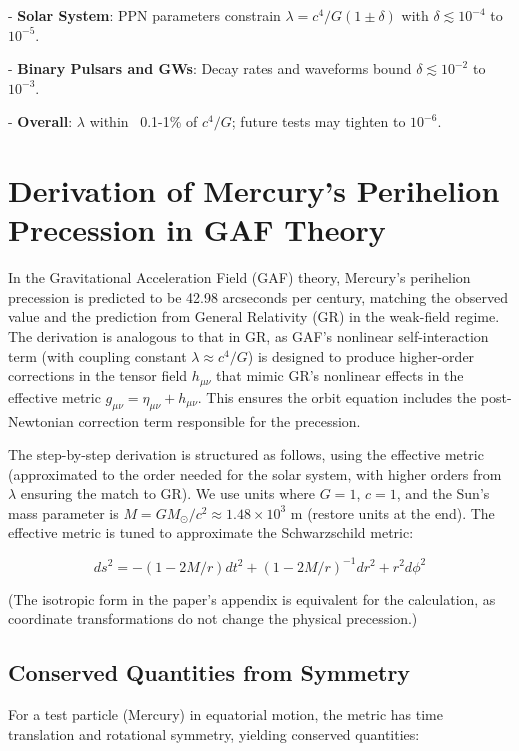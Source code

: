 \documentclass{article}
\begin{document}
- \textbf{Solar System}: PPN parameters constrain \(\lambda = c^4 / G (1 \pm \delta)\) with \(\delta \lesssim 10^{-4}\) to \(10^{-5}\).

- \textbf{Binary Pulsars and GWs}: Decay rates and waveforms bound \(\delta \lesssim 10^{-2}\) to \(10^{-3}\).

- \textbf{Overall}: \(\lambda\) within ~0.1-1\% of \(c^4 / G\); future tests may tighten to \(10^{-6}\).

\section{Derivation of Mercury's Perihelion Precession in GAF Theory}

In the Gravitational Acceleration Field (GAF) theory, Mercury's perihelion precession is predicted to be 42.98 arcseconds per century, matching the observed value and the prediction from General Relativity (GR) in the weak-field regime. The derivation is analogous to that in GR, as GAF's nonlinear self-interaction term (with coupling constant \(\lambda \approx c^4 / G\)) is designed to produce higher-order corrections in the tensor field \(h_{\mu\nu}\) that mimic GR's nonlinear effects in the effective metric \(g_{\mu\nu} = \eta_{\mu\nu} + h_{\mu\nu}\). This ensures the orbit equation includes the post-Newtonian correction term responsible for the precession.

The step-by-step derivation is structured as follows, using the effective metric (approximated to the order needed for the solar system, with higher orders from \(\lambda\) ensuring the match to GR). We use units where \(G = 1\), \(c = 1\), and the Sun's mass parameter is \(M = GM_\odot / c^2 \approx 1.48 \times 10^3\) m (restore units at the end). The effective metric is tuned to approximate the Schwarzschild metric:

\begin{equation}
ds^2 = - (1 - 2M/r) dt^2 + (1 - 2M/r)^{-1} dr^2 + r^2 d\phi^2
\end{equation}

(The isotropic form in the paper's appendix is equivalent for the calculation, as coordinate transformations do not change the physical precession.)

\subsection{Conserved Quantities from Symmetry}

For a test particle (Mercury) in equatorial motion, the metric has time translation and rotational symmetry, yielding conserved quantities:
\end{document}

